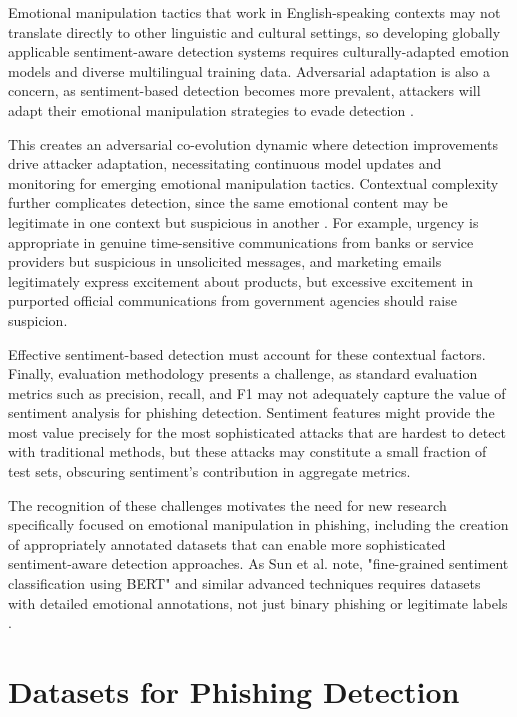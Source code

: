 Emotional manipulation tactics that work in English-speaking contexts may not translate directly to other linguistic and cultural settings, so developing globally applicable sentiment-aware detection systems requires culturally-adapted emotion models and diverse multilingual training data. Adversarial adaptation is also a concern, as sentiment-based detection becomes more prevalent, attackers will adapt their emotional manipulation strategies to evade detection \cite{biggio2018wild}. 

This creates an adversarial co-evolution dynamic where detection improvements drive attacker adaptation, necessitating continuous model updates and monitoring for emerging emotional manipulation tactics. Contextual complexity further complicates detection, since the same emotional content may be legitimate in one context but suspicious in another \cite{felt2017rethinking}. For example, urgency is appropriate in genuine time-sensitive communications from banks or service providers but suspicious in unsolicited messages, and marketing emails legitimately express excitement about products, but excessive excitement in purported official communications from government agencies should raise suspicion. 

Effective sentiment-based detection must account for these contextual factors. Finally, evaluation methodology presents a challenge, as standard evaluation metrics such as precision, recall, and F1 may not adequately capture the value of sentiment analysis for phishing detection. Sentiment features might provide the most value precisely for the most sophisticated attacks that are hardest to detect with traditional methods, but these attacks may constitute a small fraction of test sets, obscuring sentiment's contribution in aggregate metrics.

The recognition of these challenges motivates the need for new research specifically focused on emotional manipulation in phishing, including the creation of appropriately annotated datasets that can enable more sophisticated sentiment-aware detection approaches. As Sun et al. note, "fine-grained sentiment classification using \ac{BERT}" and similar advanced techniques requires datasets with detailed emotional annotations, not just binary phishing or legitimate labels \cite{munikar2019fine}.

\section{Datasets for Phishing Detection}

